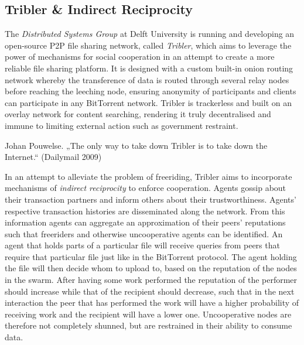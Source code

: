 \subsection{Tribler \& Indirect Reciprocity}
\label{subsec:Tribler & Indirect Reciprocity}
\noindent{}The {\it Distributed Systems Group} at Delft University is running and developing an open-source P2P file sharing network, called {\it Tribler}, which aims to leverage the power of mechanisms for social cooperation in an attempt to create a more reliable file sharing platform. It is designed with a custom built-in onion routing network whereby the transference of data is routed through several relay nodes before reaching the leeching node, ensuring anonymity of participants and clients can participate in any BitTorrent network. Tribler is trackerless and built on an overlay network for content searching, rendering it truly decentralised and immune to limiting external action such as government restraint.  \vspace{1em}\\ 

\noindent{} \begin{center}Johan Pouwelse. „The only way to take down Tribler is to take down the Internet.“ (Dailymail 2009) \vspace{1em}\\\end{center}

\noindent{}In an attempt to alleviate the problem of freeriding, Tribler aims to incorporate mechanisms of {\it indirect reciprocity} to enforce cooperation. Agents gossip about their transaction partners and inform others about their trustworthiness. Agents' respective transaction histories are disseminated along the network. From this information agents can aggregate an approximation of their peers' reputations such that freeriders and otherwise uncooperative agents can be identified. An agent that holds parts of a particular file will receive queries from peers that require that particular file just like in the BitTorrent protocol. The agent holding the file will then decide whom to upload to, based on the reputation of the nodes in the swarm. After having some work performed the reputation of the performer should increase while that of the recipient should decrease, such that in the next interaction the peer that has performed the work will have a higher probability of receiving work and the recipient will have a lower one. Uncooperative nodes are therefore not completely shunned, but are restrained in their ability to consume data. \vspace{1em}\\

